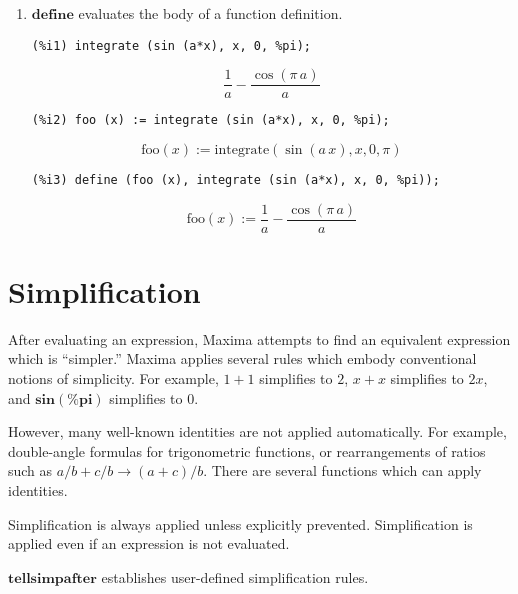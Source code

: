 \documentclass[12pt,leqno]{article}
\begin{document}
\begin{enumerate}
\item $\mathbf{define}$ evaluates the body of a function definition.
\begin{verbatim}
(%i1) integrate (sin (a*x), x, 0, %pi);
\end{verbatim}
\begin{equation}
\frac{1}{a}-\frac{\cos \left(\pi\,a\right)}{a}\tag{\%o1}
\label{eq:doc-group1-code20-1-1}
\end{equation}
\begin{verbatim}
(%i2) foo (x) := integrate (sin (a*x), x, 0, %pi);
\end{verbatim}
\begin{equation}
\mathrm{foo}\left(x\right):=\mathrm{integrate}\left(\sin \left(a\,x\right) , x , 0 , \pi\right)\tag{\%o2}
\label{eq:doc-group1-code20-2-1}
\end{equation}
\begin{verbatim}
(%i3) define (foo (x), integrate (sin (a*x), x, 0, %pi));
\end{verbatim}
\begin{equation}
\mathrm{foo}\left(x\right):=\frac{1}{a}-\frac{\cos \left(\pi\,a\right)}{a}\tag{\%o3}
\label{eq:doc-group1-code20-3-1}
\end{equation}


\end{enumerate}

\section{Simplification}

After evaluating an expression,
Maxima attempts to find an equivalent expression which is ``simpler.''
Maxima applies several rules which embody conventional notions of simplicity.
For example,
$1 + 1$ simplifies to $2$,
$x + x$ simplifies to $2 x$,
and $\mathbf{sin}(\mathbf{\%pi})$ simplifies to $0$.

However,
many well-known identities are not applied automatically.
For example,
double-angle formulas for trigonometric functions,
or rearrangements of ratios such as $a/b + c/b \rightarrow (a + c)/b$.
There are several functions which can apply identities.

Simplification is always applied unless explicitly prevented.
Simplification is applied even if an expression is not evaluated.

$\mathbf{tellsimpafter}$ establishes user-defined simplification rules.
\end{document}
